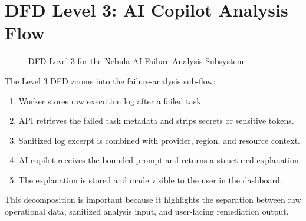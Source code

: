 \section{DFD Level 3: AI Copilot Analysis Flow}
\begin{figure}[H]
\centering
{}
\caption{DFD Level 3 for the Nebula AI Failure-Analysis Subsystem}
\label{fig:dfd_level3}
\end{figure}

The Level 3 DFD zooms into the failure-analysis sub-flow:
\begin{enumerate}
    \item Worker stores raw execution log after a failed task.
    \item API retrieves the failed task metadata and strips secrets or sensitive tokens.
    \item Sanitized log excerpt is combined with provider, region, and resource context.
    \item AI copilot receives the bounded prompt and returns a structured explanation.
    \item The explanation is stored and made visible to the user in the dashboard.
\end{enumerate}
This decomposition is important because it highlights the separation between raw operational data, sanitized analysis input, and user-facing remediation output.

